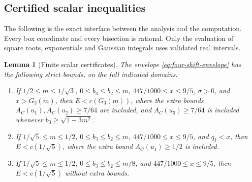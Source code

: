 \documentclass[11pt]{article}
\newtheorem{lemma}[theorem]{Lemma}
\theoremstyle{remark}\newtheorem{remark}[theorem]{Remark}
\begin{document}
\subsection{Certified scalar inequalities}\label{subsec:scalar-interface}
The following is the exact interface between the analysis and the
computation. Every box coordinate and every bisection is rational.
Only the evaluation of square roots, exponentials and Gaussian integrals
uses validated real intervals.

\begin{lemma}[Finite scalar certificates]\label{lem:three-certificates}
The envelope \eqref{eq:four-shift-envelope} has the following strict
bounds, on the full indicated domains.
\begin{enumerate}
\item If $1/2\le m\le1/\sqrt3$, $0\le b_3\le b_2\le m$,
$447/1000\le x\le9/5$, $\sigma>0$, and $x>G_3(m)$, then
$E<c(G_3(m))$,
where the extra bounds $A_C(u_1),A_C(u_2)\ge7/64$ are included,
and $A_C(u_3)\ge7/64$ is included whenever $b_3\ge\sqrt{1-3m^2}$.
\item If $1/\sqrt5\le m\le1/2$, $0\le b_3\le b_2\le m$,
$447/1000\le x\le9/5$, and $q_1<x$, then $E<c(1/\sqrt5)$,
where the extra bound $A_C(u_1)\ge1/2$ is included.
\item If $1/\sqrt5\le m\le1/2$, $0\le b_3\le b_2\le m/8$,
and $447/1000\le x\le9/5$, then $E<c(1/\sqrt5)$ without
extra bounds.
\end{enumerate}
\end{lemma}
\end{document}

